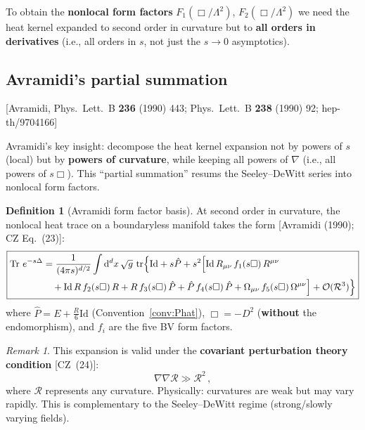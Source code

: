 \documentclass[12pt,a4paper]{article}
\theoremstyle{definition}
\newtheorem{definition}[proposition]{Definition}
\theoremstyle{remark}
\newtheorem{remark}[proposition]{Remark}
\newcommand{\Tr}{\operatorname{Tr}}
\newcommand{\tr}{\operatorname{tr}}
\newcommand{\dd}{\mathrm{d}}
\newcommand{\Id}{\mathrm{Id}}
\newcommand{\fromlit}[1]{\textcolor{blue!70!black}{\textsf{[#1]}}}
\begin{document}
To obtain the \textbf{nonlocal form factors} $F_1(\Box/\Lambda^2)$,
$F_2(\Box/\Lambda^2)$ we need the heat kernel expanded to second
order in curvature but to \textbf{all orders in derivatives}
(i.e., all orders in $s$, not just the $s\to 0$ asymptotics).

\subsection{Avramidi's partial summation}
\label{subsec:avramidi-partial}

\fromlit{Avramidi, Phys.\ Lett.\ B \textbf{236} (1990) 443;
         Phys.\ Lett.\ B \textbf{238} (1990) 92;
         hep-th/9704166}

Avramidi's key insight: decompose the heat kernel expansion not by
powers of $s$ (local) but by \textbf{powers of curvature}, while
keeping all powers of $\nabla$ (i.e., all powers of $s\Box$).
This ``partial summation'' resums the Seeley--DeWitt series into
nonlocal form factors.

\begin{definition}[Avramidi form factor basis]
At second order in curvature, the nonlocal heat trace on a
boundaryless manifold takes the form
\fromlit{Avramidi (1990); CZ Eq.~(23)}:
\begin{equation}
  \boxed{
  \begin{aligned}
  \Tr\,e^{-s\Delta}
  &= \frac{1}{(4\pi s)^{d/2}}
  \int\dd^d x\,\sqrt{g}\,\tr\Bigl\{
  \Id + s\hat{P}
  + s^2\Bigl[
  \Id\,R_{\mu\nu}\, f_1(s\Box)\, R^{\mu\nu}\\
  &\quad+ \Id\,R\,f_2(s\Box)\,R
  + R\,f_3(s\Box)\,\hat{P}
  + \hat{P}\,f_4(s\Box)\,\hat{P}
  + \Omega_{\mu\nu}\,f_5(s\Box)\,\Omega^{\mu\nu}
  \Bigr]
  + \mathcal{O}(\mathcal{R}^3)
  \Bigr\}
  \end{aligned}
  }
  \label{eq:BV-heat-trace}
\end{equation}
where $\hat{P} = E + \frac{R}{6}\Id$ (Convention~\ref{conv:Phat}),
$\Box = -D^2$ (\textbf{without} the endomorphism),
and $f_i$ are the five BV form factors.
\end{definition}

\begin{remark}
This expansion is valid under the \textbf{covariant perturbation theory
condition} \fromlit{CZ~(24)}:
\begin{equation}
  \nabla\nabla\mathcal{R} \gg \mathcal{R}^2\,,
  \label{eq:cpt-condition}
\end{equation}
where $\mathcal{R}$ represents any curvature.  Physically: curvatures
are weak but may vary rapidly.  This is complementary to the
Seeley--DeWitt regime (strong/slowly varying fields).
\end{remark}
\end{document}

